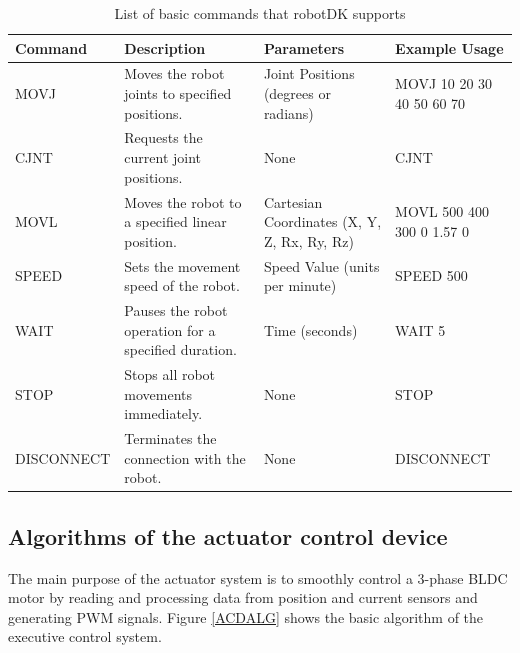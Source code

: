 \begin{table}[H]
	\caption{List of basic commands that robotDK supports}\label{TRobotDK}
	\begin{adjustbox}{width=\textwidth}
		\fontsize{14pt}{12pt}\selectfont
		\begin{tabular}{|l|l|l|l|}
			\hline
			Command    & Description                                             & Parameters                                     & Example 			Usage             \\ \hline
			MOVJ       & Moves 			the robot joints to specified positions.       & Joint 			Positions (degrees or radians)        & MOVJ 			10 20 30 40 50 60 70 \\ \hline
			CJNT       & Requests 			the current joint positions.                & None                                           & CJNT                         \\ \hline
			MOVL       & Moves 			the robot to a specified linear position.      & Cartesian 			Coordinates (X, Y, Z, Rx, Ry, Rz) & MOVL 			500 400 300 0 1.57 0 \\ \hline
			SPEED      & Sets 			the movement speed of the robot.                & Speed 			Value (units per minute)              & SPEED 			500                 \\ \hline
			WAIT       & Pauses 			the robot operation for a specified duration. & Time 			(seconds)                              & WAIT 			5                    \\ \hline
			STOP       & Stops 			all robot movements immediately.               & None                                           & STOP                         \\ \hline
			DISCONNECT & Terminates 			the connection with the robot.            & None                                           & DISCONNECT                   \\ \hline
		\end{tabular}
	\end{adjustbox}

\end{table}

\subsection{Algorithms of the actuator control device}
The main purpose of the actuator system is to smoothly control a 3-phase BLDC motor by reading and processing data from position and current sensors and generating PWM signals. Figure \ref{ACDALG} shows the basic algorithm of the executive control system.


